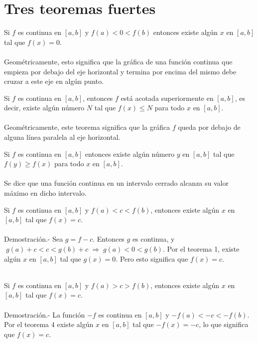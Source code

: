 \chapter{Tres teoremas fuertes}


    \begin{teo}
	Si $f$ es continua en $[a,b]$ y $f(a)<0<f(b)$ entonces existe algún $x$ en $[a,b]$ tal que $f(x)=0$.\\\\
	Geométricamente, esto significa que la gráfica de una función continua que empieza por debajo del eje horizontal y termina por encima del mismo debe cruzar a este eje en algún punto.
    \end{teo}

    \begin{teo}
	Si $f$ es continua en $[a,b]$, entonces $f$ está acotada superiormente en $[a,b]$, es decir, existe algún número $N$ tal que $f(x)\leq N$ para todo $x$ en $[a,b]$.\\\\
	Geométricamente, este teorema significa que la gráfica $f$ queda por debajo de alguna línea paralela al eje horizontal. 
    \end{teo}

    \begin{teo}
	Si $f$ es continua en $[a,b]$ entonces existe algún número $y$ en $[a,b]$ tal que $f(y)\geq f(x)$ para todo $x$ en $[a,b]$.\\\\
	Se dice que una función continua en un intervalo cerrado alcanza su valor máximo en dicho intervalo.
    \end{teo}

\begin{teo}
    Si $f$ es continua en $[a,b]$ y $f(a)<c<f(b)$, entonces existe algún $x$ en $[a,b]$ tal que $f(x)=c$.\\\\
    Demostración.-\; Sea $g=f-c$. Entonces $g$ es continua, y $\; g(a)+c < c < g(b) + c \; \Longrightarrow \; g(a)<0<g(b)$. Por el teorema 1, existe algún $x$ en $[a,b]$ tal que $g(x)=0$. Pero esto significa que $f(x)=c.$\\\\
\end{teo}

\begin{teo}
    Si $f$ es continua en $[a,b]$ y $f(a)>c>f(b)$, entonces existe algún $x$ en $[a,b]$ tal que $f(x)=c$.\\\\
    Demostración.-\; La función $-f$ es continua en $[a,b]$ y $-f(a)<-c<-f(b)$. Por el teorema 4 existe algún $x$ en $[a,b]$ tal que $-f(x)=-c$, lo que significa que $f(x)=c$.\\\\
\end{teo}

